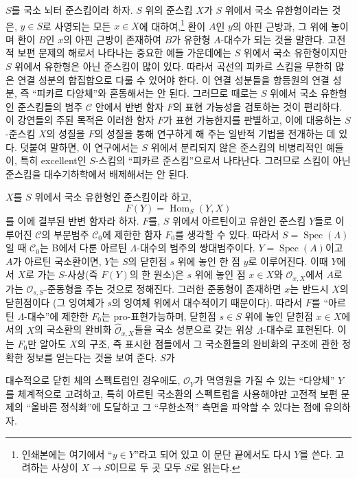 $S$를 국소 뇌터 준스킴이라 하자. $S$ 위의 준스킴 $X$가 $S$ 위에서
국소 유한형이라는 것은, $y\in S$로 사영되는 모든 $x\in X$에
대하여,\footnote{인쇄본에는 여기에서 ``$y\in Y$''라고 되어 있고 이 문단
끝에서도 다시 $Y$를 쓴다. 고려하는 사상이 $X\longrightarrow S$이므로 두
곳 모두 $S$로 읽는다.} 환이 $A$인 $y$의 아핀 근방과, 그 위에 놓이며
환이 $B$인 $x$의 아핀 근방이 존재하여 $B$가 유한형 $A$-대수가 되는
것을 말한다. 고전적 보편 문제의 해로서 나타나는 중요한 예들 가운데에는
$S$ 위에서 국소 유한형이지만 $S$ 위에서 유한형은 아닌 준스킴이 많이
있다. 따라서 곡선의 피카르 스킴을 무한히 많은 연결 성분의 합집합으로
다룰 수 있어야 한다. 이 연결 성분들을 항등원의 연결 성분, 즉
``피카르 다양체''와 혼동해서는 안 된다. 그러므로 때로는 $S$ 위에서
국소 유한형인 준스킴들의 범주 $\mathcal C$ 안에서 반변 함자 $F$의 표현
가능성을 검토하는 것이 편리하다. 이 강연들의 주된 목적은 이러한 함자
$F$가 표현 가능한지를 판별하고, 이에 대응하는 $S$-준스킴 $X$의 성질을
$F$의 성질을 통해 연구하게 해 주는 일반적 기법을 전개하는 데 있다.
덧붙여 말하면, 이 연구에서는 $S$ 위에서 분리되지 않은 준스킴의
비병리적인 예들이, 특히 excellent인 $S$-스킴의 ``피카르 준스킴''으로서
나타난다. 그러므로 스킴이 아닌 준스킴을 대수기하학에서 배제해서는 안 된다.

$X$를 $S$ 위에서 국소 유한형인 준스킴이라 하고,
\[
  F(Y)=\operatorname{Hom}_S(Y,X)
\]
를 이에 결부된 반변 함자라 하자. $F$를, $S$ 위에서 아르틴이고 유한인
준스킴 $Y$들로 이루어진 $\mathcal C$의 부분범주 $\mathcal C_0$에
제한한 함자 $F_0$를 생각할 수 있다. 따라서
$S=\operatorname{Spec}(\Lambda)$일 때 $\mathcal C_0$는 B에서 다룬
아르틴 $\Lambda$-대수의 범주의 쌍대범주이다.
$Y=\operatorname{Spec}(A)$이고 $A$가 아르틴 국소환이면, $Y$는 $S$의
닫힌점 $s$ 위에 놓인 한 점 $y$로 이루어진다. 이때 $Y$에서 $X$로 가는
$S$-사상(즉 $F(Y)$의 한 원소)은 $s$ 위에 놓인 점 $x\in X$와
$\mathcal O_{x,X}$에서 $A$로 가는 $\mathcal O_{s,S}$-준동형을 주는
것으로 정해진다. 그러한 준동형이 존재하면 $x$는 반드시 $X$의 닫힌점이다
(그 잉여체가 $s$의 잉여체 위에서 대수적이기 때문이다). 따라서 $F$를
``아르틴 $\Lambda$-대수''에 제한한 $F_0$는 pro-표현가능하며, 닫힌점
$s\in S$ 위에 놓인 닫힌점 $x\in X$에서의 $X$의 국소환의 완비화
$\widehat{\mathcal O}_{x,X}$들을 국소 성분으로 갖는 위상
$\Lambda$-대수로 표현된다. 이는 $F_0$만 알아도 $X$의 구조, 즉 표시한
점들에서 그 국소환들의 완비화의 구조에 관한 정확한 정보를 얻는다는 것을
보여 준다. $S$가

대수적으로 닫힌 체의 스펙트럼인 경우에도, $\mathcal O_Y$가 멱영원을 가질
수 있는 ``다양체'' $Y$를 체계적으로 고려하고, 특히 아르틴 국소환의
스펙트럼을 사용해야만 고전적 보편 문제의 ``올바른 정식화''에 도달하고
그 ``무한소적'' 측면을 파악할 수 있다는 점에 유의하자.

